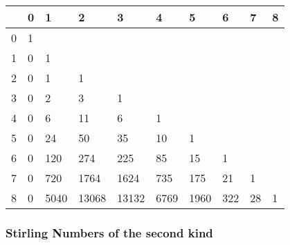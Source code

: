 \begin{center}
	\begin{tabular}{ |l||l|l|l|l|l|l|l|l|l |} 
		\hline
		\diagbox{$n$}{$k$} & 0 & 1 & 2 & 3 & 4 & 5 & 6 & 7 & 8  \\
		\hline\hline
		0 & 1 &        &       &      &        &     &    &     & \\
		1 & 0 &  1    &       &       &      &      &     &     &  \\
		2 & 0 &  1    & 1     &       &      &      &     &     &  \\
		3 & 0 &  2    & 3     & 1     &      &      &     &     &  \\
		4 & 0 &  6    & 11    & 6     & 1    &      &     &     &  \\
		5 &  0 & 24   & 50    & 35    & 10   & 1    &     &     &  \\
		6 & 0 &  120  & 274   & 225   & 85   & 15   & 1   &     &  \\
		7 & 0 &  720  & 1764  & 1624  & 735  & 175  & 21  & 1   &  \\
		8 & 0 &  5040 & 13068 & 13132 & 6769 & 1960 & 322 & 28 & 1 \\
		\hline
	\end{tabular}
\end{center}

\subsubsection{Stirling Numbers of the second kind}

